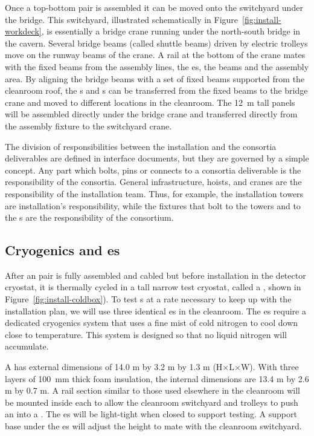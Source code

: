Once a top-bottom  pair is assembled it can be moved onto the switchyard under the bridge. 
This switchyard, illustrated schematically in Figure~\ref{fig:install-workdeck}, is essentially a bridge crane running under the north-south bridge in the cavern.  
Several bridge beams (called shuttle beams) driven by electric trolleys  move on the runway beams of the crane.  
A rail at the bottom of the crane mates with the fixed beams  from the assembly lines, the \coldbox{}es, the  beams and the  assembly area.
By aligning the bridge beams with a set of fixed beams supported from the cleanroom roof, the s and s can be transferred from the fixed beams to the bridge crane and moved to different locations in the cleanroom. 
The \SI{12}{m} tall  panels will be assembled directly under the bridge crane and transferred directly from the assembly fixture to the switchyard crane.

The division of responsibilities between the installation and the consortia deliverables are defined in interface documents, but they are governed by a simple concept. Any part which bolts, pins or connects to a consortia deliverable is the responsibility of the consortia. General infrastructure, hoists, and cranes are the responsibility of the installation team. Thus, for example, the installation towers are installation's responsibility, while the fixtures that bolt to the towers and to the s are the responsibility of the  consortium. 


\subsection{Cryogenics and \Coldbox{}es}
\label{sec:fdsp-tc-infr-cryo}



After an  pair is fully assembled and cabled but before installation in the detector cryostat, it is thermally cycled in a tall narrow test cryostat, called a \coldbox{}, shown in Figure~\ref{fig:install-coldbox}). 
To test s at a rate necessary to keep up with the installation plan, we will use three identical \coldbox{}es in the cleanroom. 
The \coldbox{}es require a dedicated cryogenics system that uses a fine mist of cold nitrogen to cool down close to  temperature. This system is designed so that no liquid nitrogen will accumulate. 


A \coldbox has external dimensions of 14.0 \si{m} by 3.2 \si{m} by 1.3 \si{m} (H$\times$L$\times$W). With three layers of \SI{100}{mm} thick foam insulation,  
the internal dimensions are 13.4 \si{m} by 2.6 \si{m} by 0.7 \si{m}. A rail section similar to those used elsewhere in the cleanroom will be mounted inside each \coldbox to allow the cleanroom switchyard and trolleys to push an    into a \coldbox. The \coldbox{}es will be light-tight when closed to support  testing. A support base under the \coldbox{}es will adjust the height to mate with the cleanroom switchyard.

